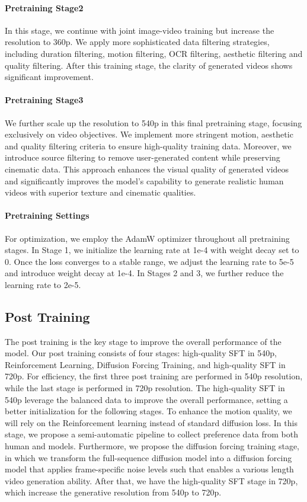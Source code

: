 \documentclass{article}
\begin{document}
{\paragraph{Pretraining Stage2}
In this stage, we continue with joint image-video training but increase the resolution to 360p. We apply more sophisticated data filtering strategies, including duration filtering, motion filtering, OCR filtering, aesthetic filtering and quality filtering. After this training stage, the clarity of generated videos shows significant improvement.
\paragraph{Pretraining Stage3}
We further scale up the resolution to 540p in this final pretraining stage, focusing exclusively on video objectives. We implement more stringent motion, aesthetic and quality filtering criteria to ensure high-quality training data. Moreover, we introduce source filtering to remove user-generated content while preserving cinematic data. This approach enhances the visual quality of generated videos and significantly improves the model's capability to generate realistic human videos with superior texture and cinematic qualities. 
\paragraph{Pretraining Settings}
For optimization, we employ the AdamW optimizer throughout all pretraining stages. In Stage 1, we initialize the learning rate at 1e-4 with weight decay set to 0. Once the loss converges to a stable range, we adjust the learning rate to 5e-5 and introduce weight decay at 1e-4. In Stages 2 and 3, we further reduce the learning rate to 2e-5.
\subsection{Post Training}
\label{subsec:posttraining}
The post training is the key stage to improve the overall performance of the model. Our post training consists of four stages: high-quality SFT in 540p, Reinforcement Learning, Diffusion Forcing Training, and high-quality SFT in 720p. For efficiency, the first three post training are performed in 540p resolution, while the last stage is performed in 720p resolution. The high-quality SFT in 540p leverage the balanced data to improve the overall performance, setting a better initialization for the following stages. To enhance the motion quality, we will rely on the Reinforcement learning instead of standard diffusion loss. In this stage, we propose a semi-automatic pipeline to collect preference data from both human and models. Furthermore, we propose the diffusion forcing training stage, in which we transform the full-sequence diffusion model into a diffusion forcing model that applies frame-specific noise levels such that enables a various length video generation ability. After that, we have the high-quality SFT stage in 720p, which increase the generative resolution from 540p to 720p.
}
\end{document}
